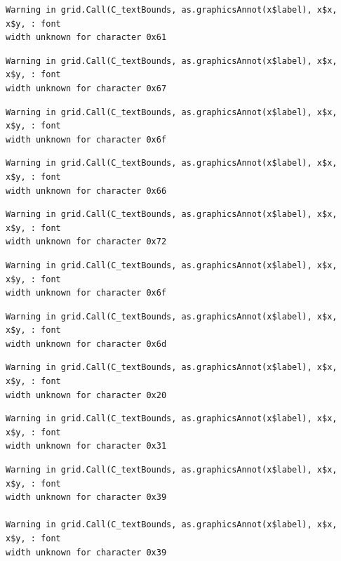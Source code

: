 \documentclass[
  letterpaper,
  DIV=11,
  numbers=noendperiod]{scrreprt}
\begin{document}
\begin{verbatim}
Warning in grid.Call(C_textBounds, as.graphicsAnnot(x$label), x$x, x$y, : font
width unknown for character 0x61
\end{verbatim}

\begin{verbatim}
Warning in grid.Call(C_textBounds, as.graphicsAnnot(x$label), x$x, x$y, : font
width unknown for character 0x67
\end{verbatim}

\begin{verbatim}
Warning in grid.Call(C_textBounds, as.graphicsAnnot(x$label), x$x, x$y, : font
width unknown for character 0x6f
\end{verbatim}

\begin{verbatim}
Warning in grid.Call(C_textBounds, as.graphicsAnnot(x$label), x$x, x$y, : font
width unknown for character 0x66
\end{verbatim}

\begin{verbatim}
Warning in grid.Call(C_textBounds, as.graphicsAnnot(x$label), x$x, x$y, : font
width unknown for character 0x72
\end{verbatim}

\begin{verbatim}
Warning in grid.Call(C_textBounds, as.graphicsAnnot(x$label), x$x, x$y, : font
width unknown for character 0x6f
\end{verbatim}

\begin{verbatim}
Warning in grid.Call(C_textBounds, as.graphicsAnnot(x$label), x$x, x$y, : font
width unknown for character 0x6d
\end{verbatim}

\begin{verbatim}
Warning in grid.Call(C_textBounds, as.graphicsAnnot(x$label), x$x, x$y, : font
width unknown for character 0x20
\end{verbatim}

\begin{verbatim}
Warning in grid.Call(C_textBounds, as.graphicsAnnot(x$label), x$x, x$y, : font
width unknown for character 0x31
\end{verbatim}

\begin{verbatim}
Warning in grid.Call(C_textBounds, as.graphicsAnnot(x$label), x$x, x$y, : font
width unknown for character 0x39

Warning in grid.Call(C_textBounds, as.graphicsAnnot(x$label), x$x, x$y, : font
width unknown for character 0x39
\end{verbatim}
\end{document}
